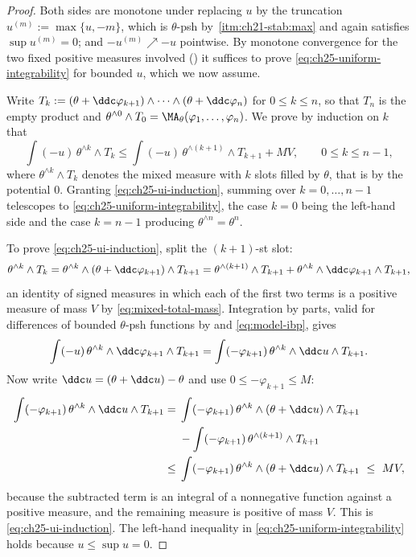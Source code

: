 \begin{proof}
Both sides are monotone under replacing $u$ by the truncation
$u^{(m)}:=\max\{u,-m\}$, which is $\theta$-psh by
\,\cref{itm:ch21-stab:max} and again satisfies
$\sup u^{(m)}=0$; and $-u^{(m)}\nearrow-u$ pointwise.  By monotone
convergence for the two fixed positive measures involved
() it suffices to prove
\eqref{eq:ch25-uniform-integrability} for bounded $u$, which we now assume.

Write $T_k:=(\theta+\ddc\varphi_{k+1})\wedge\cdots\wedge
(\theta+\ddc\varphi_n)$ for $0\leq k\leq n$, so that $T_n$ is the empty
product and $\theta^{\wedge0}\wedge T_0=\MA_\theta(\varphi_1,\ldots,
\varphi_n)$.  We prove by induction on $k$ that
\begin{equation}
\label{eq:ch25-ui-induction}
 \int(-u)\,\theta^{\wedge k}\wedge T_k
 \leq\int(-u)\,\theta^{\wedge(k+1)}\wedge T_{k+1}+MV ,
 \qquad 0\leq k\leq n-1 ,
\end{equation}
where $\theta^{\wedge k}\wedge T_k$ denotes the mixed measure with $k$
slots filled by $\theta$, that is by the potential $0$.  Granting
\eqref{eq:ch25-ui-induction}, summing over $k=0,\ldots,n-1$ telescopes to
\eqref{eq:ch25-uniform-integrability}, the case $k=0$ being the left-hand
side and the case $k=n-1$ producing $\theta^{\wedge n}=\theta^n$.

To prove \eqref{eq:ch25-ui-induction}, split the $(k+1)$-st slot:
\[
 \theta^{\wedge k}\wedge T_k
 =\theta^{\wedge k}\wedge(\theta+\ddc\varphi_{k+1})\wedge T_{k+1}
 =\theta^{\wedge(k+1)}\wedge T_{k+1}
  +\theta^{\wedge k}\wedge\ddc\varphi_{k+1}\wedge T_{k+1},
\]
an identity of signed measures in which each of the first two terms is a
positive measure of mass $V$ by \eqref{eq:mixed-total-mass}.  Integration
by parts, valid for differences of bounded $\theta$-psh functions by
 and \eqref{eq:model-ibp}, gives
\[
 \int(-u)\,\theta^{\wedge k}\wedge\ddc\varphi_{k+1}\wedge T_{k+1}
 =\int(-\varphi_{k+1})\,\theta^{\wedge k}\wedge\ddc u\wedge T_{k+1}.
\]
Now write $\ddc u=(\theta+\ddc u)-\theta$ and use
$0\leq-\varphi_{k+1}\leq M$:
\[
\begin{split}
 \int(-\varphi_{k+1})\,\theta^{\wedge k}\wedge\ddc u\wedge T_{k+1}
 ={}&\int(-\varphi_{k+1})\,
     \theta^{\wedge k}\wedge(\theta+\ddc u)\wedge T_{k+1}\\
    &-\int(-\varphi_{k+1})\,\theta^{\wedge(k+1)}\wedge T_{k+1}\\
 \leq{}&\int(-\varphi_{k+1})\,
     \theta^{\wedge k}\wedge(\theta+\ddc u)\wedge T_{k+1}
 \ \leq\ MV,
\end{split}
\]
because the subtracted term is an integral of a nonnegative function against
a positive measure, and the remaining measure is positive of mass $V$.
This is \eqref{eq:ch25-ui-induction}.  The left-hand inequality in
\eqref{eq:ch25-uniform-integrability} holds because $u\leq\sup u=0$.
\end{proof}

